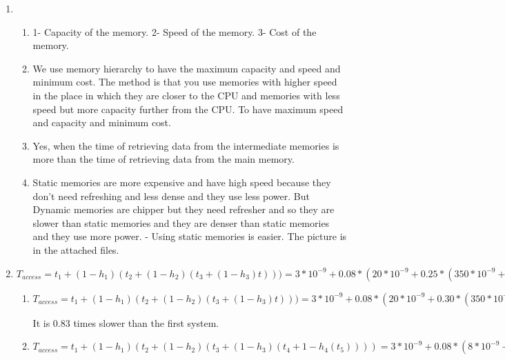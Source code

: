 \documentclass[12pt]{article}
\begin{document}
\begin{enumerate}
\begin{table}[h]
\begin{tabular}{|c|c|c|c|c|}
            \end{tabular}

        \end{table}
        The circuit is in the attached files.


    \item
        \begin{enumerate}
            \item
                1- Capacity of the memory.
                2- Speed of the memory.
                3- Cost of the memory.
            \item
                We use memory hierarchy to have the maximum capacity
                and speed and minimum cost. The method is that you use memories
                with higher speed in the place in which they are closer to the
                CPU and memories with less speed but more capacity further from
                the CPU. To have maximum speed and capacity and minimum cost.

            \item
                Yes, when the time of retrieving data from the intermediate
                memories is more than the time of retrieving data from the main
                memory.
            \item
                Static memories are more expensive and have high speed because
                they don't need refreshing and less dense and they use less power.
                But Dynamic memories are chipper but they need refresher and so
                they are slower than static memories and they are denser than
                static memories and they use more power. - Using static memories
                is easier.
                The picture is in the attached files.
        \end{enumerate}
    \item

        $T_{access}=t_1+(1-h_1)(t_2+(1-h_2)(t_3+(1-h_3)t)))=
        3*10^{-9}+0.08*(20*10^{-9}+0.25*(350*10^{-9}+0.65*12*10^{-3}))=1.56*10^{-4} s$
        \begin{enumerate}
            \item
                $T_{access}=t_1+(1-h_1)(t_2+(1-h_2)(t_3+(1-h_3)t)))=
                3*10^{-9}+0.08*(20*10^{-9}+0.30*(350*10^{-9}+0.65*12*10^{-3}))=1.87213*10^{-4}$

                It is 0.83 times slower than the first system.
            \item
                $T_{access}=t_1+(1-h_1)(t_2+(1-h_2)(t_3+(1-h_3)(t_4+1-h_4(t_5))))=
                3*10^{-9}+0.08*(8*10^{-9}+0.15*(20*10^{-9}+0.3*(10^{-9}*350+0.65*
                10^{-3}*12)))=2.81*10^{-5}$


\end{enumerate}
\end{enumerate}
\end{document}
